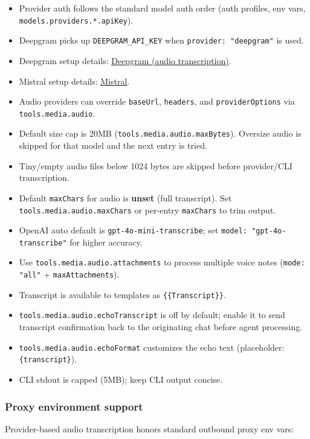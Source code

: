 \begin{itemize}
  \item Provider auth follows the standard model auth order (auth profiles, env vars, \texttt{models.providers.*.apiKey}).
  \item Deepgram picks up \texttt{DEEPGRAM\_API\_KEY} when \texttt{provider: "deepgram"} is used.
  \item Deepgram setup details: \href{/providers/deepgram}{Deepgram (audio transcription)}.
  \item Mistral setup details: \href{/providers/mistral}{Mistral}.
  \item Audio providers can override \texttt{baseUrl}, \texttt{headers}, and \texttt{providerOptions} via \texttt{tools.media.audio}.
  \item Default size cap is 20MB (\texttt{tools.media.audio.maxBytes}). Oversize audio is skipped for that model and the next entry is tried.
  \item Tiny/empty audio files below 1024 bytes are skipped before provider/CLI transcription.
  \item Default \texttt{maxChars} for audio is \textbf{unset} (full transcript). Set \texttt{tools.media.audio.maxChars} or per-entry \texttt{maxChars} to trim output.
  \item OpenAI auto default is \texttt{gpt-4o-mini-transcribe}; set \texttt{model: "gpt-4o-transcribe"} for higher accuracy.
  \item Use \texttt{tools.media.audio.attachments} to process multiple voice notes (\texttt{mode: "all"} + \texttt{maxAttachments}).
  \item Transcript is available to templates as \texttt{\{\{Transcript\}\}}.
  \item \texttt{tools.media.audio.echoTranscript} is off by default; enable it to send transcript confirmation back to the originating chat before agent processing.
  \item \texttt{tools.media.audio.echoFormat} customizes the echo text (placeholder: \texttt{\{transcript\}}).
  \item CLI stdout is capped (5MB); keep CLI output concise.
\end{itemize}


\subsubsection{Proxy environment support}


Provider-based audio transcription honors standard outbound proxy env vars:

